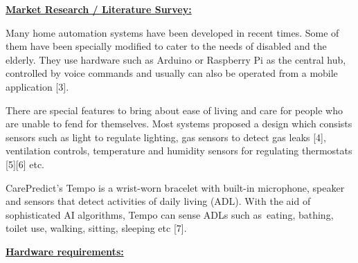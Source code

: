 \documentclass[12pt]{article}
\begin{document}
\vspace{\baselineskip}
{\fontsize{14pt}{16.8pt}\selectfont \textbf{\uline{Market Research / Literature Survey:}}\par}\par

\begin{justify}
Many home automation systems have been developed in recent times. Some of them have been specially modified to cater to the needs of disabled and the elderly. They use hardware such as Arduino or Raspberry Pi as the central hub, controlled by voice commands and usually can also be operated from a mobile application [3].
\end{justify}\par

\begin{justify}
There are special features to bring about ease of living and care for people who are unable to fend for themselves. Most systems proposed a design which consists sensors such as light to regulate lighting, gas sensors to detect gas leaks [4], ventilation controls, temperature and humidity sensors for regulating thermostats [5][6] etc. 
\end{justify}\par

\begin{justify}
CarePredict’s Tempo is a wrist-worn bracelet with built-in microphone, speaker and sensors that detect activities of daily living (ADL). With the aid of sophisticated AI algorithms, Tempo can sense ADLs such as eating, bathing, toilet use, walking, sitting, sleeping etc [7].
\end{justify}\par


\vspace{\baselineskip}
{\fontsize{14pt}{16.8pt}\selectfont \textbf{\uline{Hardware requirements:}}\par}\par
\end{document}
